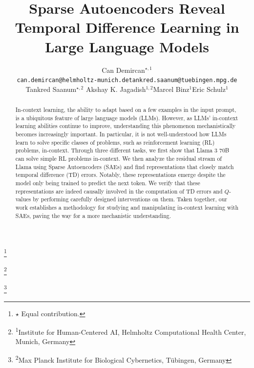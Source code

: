 \documentclass{article}
\title{Sparse Autoencoders Reveal Temporal Difference Learning in Large Language Models}
\author{\hspace{1.5cm}Can Demircan$^{\star, 1}$\\ \hspace{1.5cm}\scriptsize{\texttt{can.demircan@helmholtz-munich.de}}\hspace{1.29cm}\scriptsize{\texttt{tankred.saanum@tuebingen.mpg.de}}  \And \hspace{-6.5cm}Tankred Saanum$^{\star, 2}$ \AND Akshay K. Jagadish$^{1, 2}$\And Marcel Binz$^{1}$\And Eric Schulz$^{1}$}
\newcommand\blfootnote[1]{
  \begingroup
  \renewcommand\thefootnote{}\footnote{#1}
  \addtocounter{footnote}{-1}
  \endgroup
}
\begin{document}
\maketitle
\begin{abstract}
In-context learning, the ability to adapt based on a few examples in the input prompt, is a ubiquitous feature of large language models (LLMs). However, as LLMs' in-context learning abilities continue to improve, understanding this phenomenon mechanistically becomes increasingly important. In particular, it is not well-understood how LLMs learn to solve specific classes of problems, such as reinforcement learning (RL) problems, in-context. Through three different tasks, we first show that Llama $3$ $70$B can solve simple RL problems in-context. We then analyze the residual stream of Llama using Sparse Autoencoders (SAEs) and find representations that closely match temporal difference (TD) errors. Notably, these representations emerge despite the model only being trained to predict the next token. We verify that these representations are indeed causally involved in the computation of TD errors and $Q$-values by performing carefully designed interventions on them. Taken together, our work establishes a methodology for studying and manipulating in-context learning with SAEs, paving the way for a more mechanistic understanding.
\end{abstract}
\blfootnote{$\star$ Equal contribution.}
\blfootnote{\textsuperscript{1}Institute for Human-Centered AI, Helmholtz Computational Health Center, Munich, Germany}
\blfootnote{\textsuperscript{2}Max Planck Institute for Biological Cybernetics, Tübingen, Germany}
\end{document}
